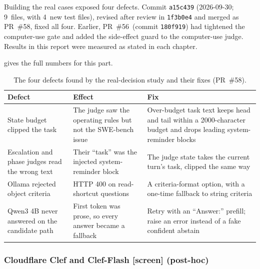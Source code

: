 \documentclass[11pt,letterpaper]{article}
\newcommand{\code}[1]{\texttt{#1}}
\newcommand{\screen}{\mbox{\textsf{\small\color{okgray}[screen]}}}
\newcommand{\PRFixDate}{2026-09-30}
\newcommand{\PRFixFiles}{9}
\newcommand{\PRFixNumber}{58}
\newcommand{\PRFixReviewSha}{1f3b0e4}
\newcommand{\PRFixSha}{a15c439}
\newcommand{\PRFixTaskBudget}{2000}
\newcommand{\PRFixTests}{4}
\newcommand{\SinceCommit}{180f919}
\newcommand{\SincePR}{56}
\begin{document}
Building the real cases exposed four defects. Commit \code{\PRFixSha} (\PRFixDate; \PRFixFiles\ files, with
\PRFixTests\ new test files), revised after review in \code{\PRFixReviewSha} and merged as PR~\#\PRFixNumber,
fixed all four. Earlier, PR~\#\SincePR\ (commit \code{\SinceCommit}) had tightened the computer-use gate and added
the side-effect guard to the computer-use judge. Results in this report were measured as stated in each chapter.

 gives the full numbers for this part.

\begin{table}[tbp]
\centering\small
\caption{The four defects found by the real-decision study and their fixes (PR~\#\PRFixNumber).}
\label{vt:tab:prfixes}
\begin{tabular*}{\textwidth}{@{\extracolsep{\fill}}>{\raggedright\arraybackslash}p{} >{\raggedright\arraybackslash}p{} >{\raggedright\arraybackslash}p{}@{}}
\toprule
Defect & Effect & Fix \\
\midrule
State budget clipped the task & The judge saw the operating rules but not the SWE-bench issue & Over-budget task text keeps head and tail
  within a \PRFixTaskBudget-character budget and drops leading system-reminder blocks \\
Escalation and phase judges read the wrong text & Their ``task'' was the injected system-reminder block & The judge
  state takes the current turn's task, clipped the same way \\
Ollama rejected object criteria & HTTP 400 on read-shortcut questions & A criteria-format option, with a one-time
  fallback to string criteria \\
Qwen3 4B never answered on the candidate path & First token was prose, so every answer became a fallback & Retry with an
  ``Answer:'' prefill; raise an error instead of a fake confident abstain \\
\bottomrule
\end{tabular*}
\end{table}
\subsubsection{Cloudflare Clef and Clef-Flash \texorpdfstring{\screen}{[screen]} (post-hoc)}\label{vt:sec:clef}
\end{document}
